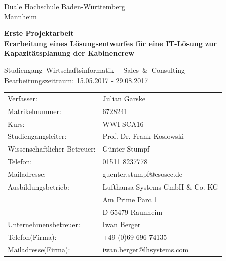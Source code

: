 \documentclass [12pt, a4paper, oneside, titlepage, ngerman]{article}
\begin{document}
\begin{titlepage}
\Large
\begin{minipage}{\textwidth} \centering \Large
     Duale Hochschule Baden-Württemberg \\  
     Mannheim 
\end{minipage} \vspace{1cm}

\begin{minipage}{\textwidth} \centering \Large
     \textbf{Erste Projektarbeit \\ Erarbeitung eines Lösungsentwurfes für eine IT-Lösung zur Kapazitätsplanung der Kabinencrew}
\end{minipage} \vspace{1cm}

\begin{minipage}{\textwidth} \centering \Large
     \mbox{Studiengang Wirtschaftsinformatik - Sales \& Consulting}\\  \large Bearbeitungszeitraum: 15.05.2017 - 29.08.2017
\end{minipage} \vspace{1cm}


\begin{table}[h!]
\begin{tabular}{ll}
Verfasser: & Julian Garske \\
Matrikelnummer: & 6728241 \vspace{0.5cm} \\ 
Kurs: & WWI SCA16 \\
Studiengangsleiter:& Prof. Dr. Frank Koslowski \vspace{0.5cm} \\
Wissenschaftlicher Betreuer: & Günter Stumpf \\ 
Telefon:& 01511 8237778\\ 
Mailadresse:& guenter.stumpf@esosec.de \vspace{0.5cm}\\
Ausbildungsbetrieb: &Lufthansa Systems GmbH \& Co. KG \\ 
& Am Prime Parc 1 \\ 
& D 65479 Raunheim \vspace{0.5cm}\\
Unternehmensbetreuer: & Iwan Berger \\ 
Telefon(Firma): &+49 (0)69 696 74135 \\
 Mailadresse(Firma):& iwan.berger@lhsystems.com \\
\end{tabular}
\end{table}



\end{titlepage}
\end{document}
